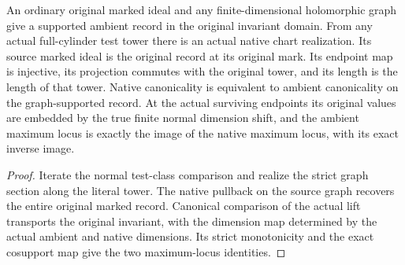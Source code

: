 \begin{theorem}
\label{hir:g1-finite-closed-graph-original-comparison}
\leanok
An ordinary original marked ideal and any finite-dimensional
holomorphic graph give a supported ambient record in the original
invariant domain. From any actual full-cylinder test tower there
is an actual native chart realization. Its source marked ideal
is the original record at its original mark. Its endpoint map
is injective, its projection commutes with the original tower,
and its length is the length of that tower. Native canonicality
is equivalent to ambient canonicality on the graph-supported
record. At the actual surviving endpoints its original values
are embedded by the true finite normal dimension shift, and
the ambient maximum locus is exactly the image of the native
maximum locus, with its exact inverse image.
\end{theorem}
\begin{proof}
Iterate the normal test-class comparison and realize the strict
graph section along the literal tower. The native pullback on
the source graph recovers the entire original marked record.
Canonical comparison of the actual lift transports the original
invariant, with the dimension map determined by the actual
ambient and native dimensions. Its strict monotonicity and the
exact cosupport map give the two maximum-locus identities.
\end{proof}
